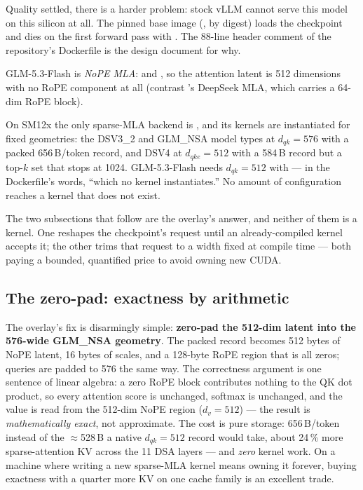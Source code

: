 Quality settled, there is a harder problem: stock vLLM cannot serve this
model on this silicon at all. The pinned base image
(, by digest) loads the
checkpoint and dies on the first forward pass with
. The 88-line header comment of the
repository's Dockerfile is the design document for why.

GLM-5.3-Flash is \emph{NoPE MLA}:  and
, so the attention latent is 512 dimensions with no
RoPE component at all (contrast 's DeepSeek MLA, which
carries a 64-dim RoPE block).

On SM12x the only sparse-MLA backend is
, and its kernels are instantiated for
fixed geometries: the DSV3\_2 and GLM\_NSA model types at
$d_{qk}=576$ with a packed 656\,B/token record, and DSV4 at
$d_{qke}=512$ with a 584\,B record but a top-$k$ set that stops at 1024.
GLM-5.3-Flash needs $d_{qk}=512$ with  --- in the
Dockerfile's words, ``which no kernel instantiates.'' No amount of
configuration reaches a kernel that does not exist.

The two subsections that follow are the overlay's answer, and neither of
them is a kernel. One reshapes the checkpoint's request until an
already-compiled kernel accepts it; the other trims that request to a width
fixed at compile time --- both paying a bounded, quantified price to avoid
owning new CUDA.

\subsection{The zero-pad: exactness by arithmetic}

The overlay's fix is disarmingly simple: \textbf{zero-pad the 512-dim latent
into the 576-wide GLM\_NSA geometry}. The packed record becomes 512 bytes of
NoPE latent, 16 bytes of scales, and a 128-byte RoPE region that is all
zeros; queries are padded to 576 the same way. The correctness argument is
one sentence of linear algebra: a zero RoPE block contributes nothing to the
QK dot product, so every attention score is unchanged, softmax is unchanged,
and the value is read from the 512-dim NoPE region ($d_v=512$) --- the
result is \emph{mathematically exact}, not approximate. The cost is pure
storage: 656\,B/token instead of the $\approx$528\,B a native $d_{qk}=512$
record would take, about 24\,\% more sparse-attention KV across the 11 DSA
layers --- and \emph{zero} kernel work. On a machine where writing a new
sparse-MLA kernel means owning it forever, buying exactness with a quarter
more KV on one cache family is an excellent trade.

